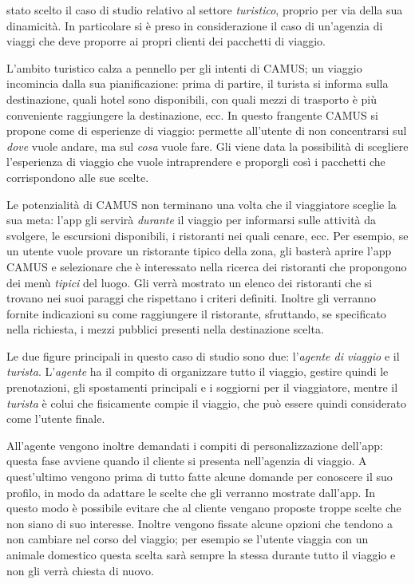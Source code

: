 \upe stato scelto il caso di studio relativo al settore \emph{turistico}, proprio per via della sua dinamicità. In particolare si è preso in considerazione il caso di un'agenzia di viaggi che deve proporre ai propri clienti dei pacchetti di viaggio.

L'ambito turistico calza a pennello per gli intenti di CAMUS; un viaggio incomincia dalla sua pianificazione: prima di partire, il turista si informa sulla destinazione, quali hotel sono disponibili, con quali mezzi di trasporto è più conveniente raggiungere la destinazione, ecc. In questo frangente CAMUS si propone come  di esperienze di viaggio: permette all'utente di non concentrarsi sul \emph{dove} vuole andare, ma sul \emph{cosa} vuole fare. Gli viene data la possibilità di scegliere l'esperienza di viaggio che vuole intraprendere e proporgli così i pacchetti che corrispondono alle sue scelte.

Le potenzialità di CAMUS non terminano una volta che il viaggiatore sceglie la sua meta: l'app gli servirà \emph{durante} il viaggio per informarsi sulle attività da svolgere, le escursioni disponibili, i ristoranti nei quali cenare, ecc. Per esempio, se un utente vuole provare un ristorante tipico della zona, gli basterà aprire l'app CAMUS e selezionare che è interessato nella ricerca dei ristoranti che propongono dei menù \emph{tipici} del luogo. Gli verrà mostrato un elenco dei ristoranti che si trovano nei suoi paraggi che rispettano i criteri definiti. Inoltre gli verranno fornite indicazioni su come raggiungere il ristorante, sfruttando, se specificato nella richiesta, i mezzi pubblici presenti nella destinazione scelta.

Le due figure principali in questo caso di studio sono due: l'\emph{agente di viaggio} e il \emph{turista}. L'\emph{agente} ha il compito di organizzare tutto il viaggio, gestire quindi le prenotazioni, gli spostamenti principali e i soggiorni per il viaggiatore, mentre il \emph{turista} è colui che fisicamente compie il viaggio, che può essere quindi considerato come l'utente finale.

All'agente vengono inoltre demandati i compiti di personalizzazione dell'app: questa fase avviene quando il cliente si presenta nell'agenzia di viaggio. A quest'ultimo vengono prima di tutto fatte alcune domande per conoscere il suo profilo, in modo da adattare le scelte che gli verranno mostrate dall'app. In questo modo è possibile evitare che al cliente vengano proposte troppe scelte che non siano di suo interesse. Inoltre vengono fissate alcune opzioni che tendono a non cambiare nel corso del viaggio; per esempio se l'utente viaggia con un animale domestico questa scelta sarà sempre la stessa durante tutto il viaggio e non gli verrà chiesta di nuovo.%

